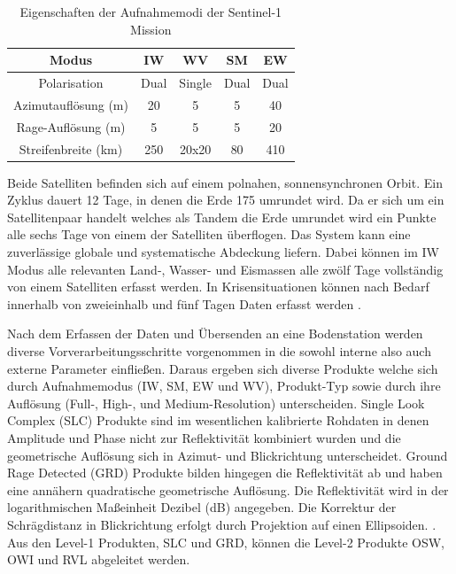 \begin{center}
\begin{table}[H]
    \caption{Eigenschaften der Aufnahmemodi der Sentinel-1 Mission \cite{sentinel_1_overview}}
    \centering
    \begin{tabular}{c|c c c c } 
        Modus & IW & WV & SM & EW \\ 
        \hline
        Polarisation & Dual & Single & Dual & Dual \\ 
        Azimutauflösung (m) & 20 & 5 & 5 & 40 \\
        Rage-Auflösung (m) & 5 & 5 & 5 & 20 \\
        Streifenbreite (km) & 250 & 20x20 & 80 & 410\\
    \end{tabular}
    \label{aufnahmemodi_sentinel_1}
\end{table}
\end{center}

Beide Satelliten befinden sich auf einem polnahen, sonnensynchronen Orbit. Ein Zyklus dauert 12 Tage, in denen die Erde 175 umrundet wird. Da er sich um ein Satellitenpaar
handelt welches als Tandem die Erde umrundet wird ein Punkte alle sechs Tage von einem der Satelliten überflogen. Das System kann eine zuverlässige globale und systematische
Abdeckung liefern. Dabei können im IW Modus alle relevanten Land-, Wasser- und Eismassen alle zwölf Tage vollständig von einem Satelliten erfasst werden. 
In Krisensituationen können nach Bedarf innerhalb von zweieinhalb und fünf Tagen Daten erfasst werden \cite{sentinel_1_overview}. 

Nach dem Erfassen der Daten und Übersenden an eine Bodenstation werden diverse Vorverarbeitungsschritte vorgenommen in die sowohl interne also auch externe
Parameter einfließen. Daraus ergeben sich diverse Produkte welche sich durch Aufnahmemodus (IW, SM, EW und WV), Produkt-Typ sowie durch ihre 
Auflösung (Full-, High-, und Medium-Resolution) unterscheiden. Single Look Complex (SLC) Produkte sind im wesentlichen kalibrierte Rohdaten in denen Amplitude und Phase nicht
zur Reflektivität kombiniert wurden und die geometrische Auflösung sich in Azimut- und Blickrichtung unterscheidet. Ground Rage Detected (GRD) Produkte bilden hingegen die 
Reflektivität ab und haben eine annähern quadratische geometrische Auflösung. Die Reflektivität wird in der logarithmischen Maßeinheit Dezibel (dB) angegeben. Die Korrektur 
der Schrägdistanz in Blickrichtung erfolgt durch Projektion auf einen Ellipsoiden. \cite{sentinel_1_definition}. Aus den Level-1 Produkten, SLC und GRD, können die 
Level-2 Produkte OSW, OWI und RVL abgeleitet werden.

